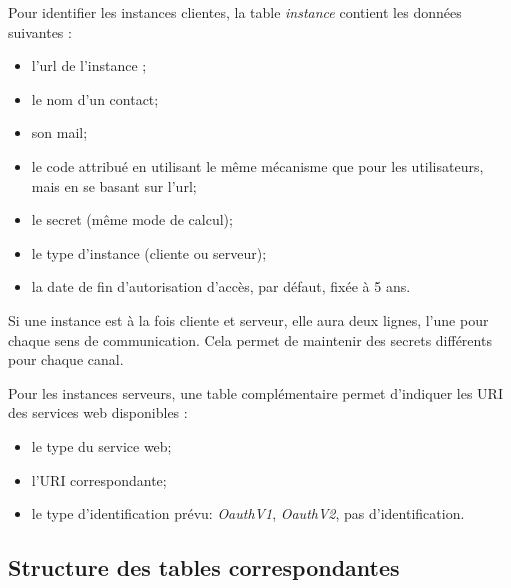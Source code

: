 Pour identifier les instances clientes, la table \textit{instance} contient les données suivantes :
\begin{itemize}
\item l'url de l'instance ;
\item le nom d'un contact;
\item son mail;
\item le code attribué en utilisant le même mécanisme que pour les utilisateurs, mais en se basant sur l'url;
\item le secret (même mode de calcul);
\item le type d'instance (cliente ou serveur);
\item la date de fin d'autorisation d'accès, par défaut, fixée à 5 ans.
\end{itemize}

Si une instance est à la fois cliente et serveur, elle aura deux lignes, l'une pour chaque sens de communication. Cela permet de maintenir des secrets différents pour chaque canal.

Pour les instances \og serveurs\fg{}, une table complémentaire permet d'indiquer les URI des services web disponibles :
\begin{itemize}
\item le type du service web;
\item l'URI correspondante;
\item le type d'identification prévu: \textit{OauthV1}, \textit{OauthV2}, pas d'identification.
\end{itemize}

\subsection{Structure des tables correspondantes}

